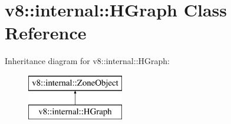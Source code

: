 \hypertarget{classv8_1_1internal_1_1_h_graph}{}\section{v8\+:\+:internal\+:\+:H\+Graph Class Reference}
\label{classv8_1_1internal_1_1_h_graph}
Inheritance diagram for v8\+:\+:internal\+:\+:H\+Graph\+:\begin{figure}[H]
\begin{center}
\leavevmode
\includegraphics[height=2.000000cm]{classv8_1_1internal_1_1_h_graph}
\end{center}
\end{figure}
